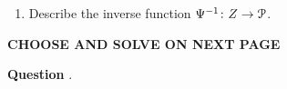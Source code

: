 \documentclass[12pt]{article} %
\begin{document}
\begin{qstn}
\begin{enumerate}[label=(\alph*)]
\begin{enumerate}[label=(\alph*)]
      \end{enumerate}
  \item Describe the inverse function $\Psi^{-1} \colon Z \to \EuScript{P}$.\\

  \end{enumerate}

  \textbf{\large{CHOOSE AND SOLVE ON NEXT PAGE}}
  
\end{qstn}

\newpage

\textbf{Question} \underline{\hspace*{1cm}}.
\end{document}
